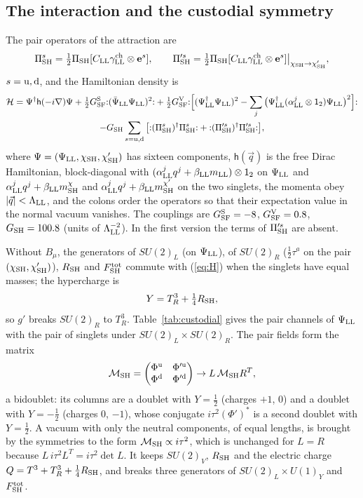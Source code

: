 \documentclass[aps,prd,onecolumn,superscriptaddress,nofootinbib,floatfix,longbibliography]{revtex4-2}
\newcommand{\LL}{{\rm LL}}
\newcommand{\SF}{{\rm SF}}
\newcommand{\SH}{{\rm SH}}
\begin{document}
\subsection{The interaction and the custodial symmetry}

The pair operators of the attraction are
\begin{equation}
\Pi^s_\SH=\tfrac12\Pi_\SH[C_\LL\gamma^{\rm ch}_\LL\otimes\mathbf e^s],\qquad \Pi'^s_\SH=\tfrac12\Pi_\SH[C_\LL\gamma^{\rm ch}_\LL\otimes\mathbf e^s]\big|_{\chi_\SH\to\chi'_\SH},
\label{eq:pairs}
\end{equation}
$s={\rm u},{\rm d}$, and the Hamiltonian density is
\begin{multline}
\mathcal H=\Psi^\dagger\mathsf h(-i\nabla)\Psi+\tfrac12G^{\rm S}_\SF{:}(\bar\Psi_\LL\Psi_\LL)^2{:}
+\tfrac12G^{\rm V}_\SF{:}\Big[(\Psi^\dagger_\LL\Psi_\LL)^2-\sum_j\big(\Psi^\dagger_\LL(\alpha^j_\LL\otimes\mathsf 1_2)\Psi_\LL\big)^2\Big]{:}\\
-G_\SH\sum_{s={\rm u},{\rm d}}\big[{:}(\Pi^s_\SH)^\dagger\Pi^s_\SH{:}+{:}(\Pi'^s_\SH)^\dagger\Pi'^s_\SH{:}\big],
\label{eq:H}
\end{multline}
where $\Psi=(\Psi_\LL,\chi_\SH,\chi'_\SH)$ has sixteen components, $\mathsf h(\vec q)$ is the free Dirac Hamiltonian,
block-diagonal with $(\alpha^j_\LL q^j+\beta_\LL m_\LL)\otimes\mathsf 1_2$ on $\Psi_\LL$ and $\alpha^j_\LL q^j+\beta_\LL m^\chi_\SH$ and
$\alpha^j_\LL q^j+\beta_\LL m^{\chi'}_\SH$ on the two singlets, the momenta obey $|\vec q|<\Lambda_\LL$, and the colons order the operators so that their expectation value in the
normal vacuum vanishes. The couplings are $G^{\rm S}_\SF=-8$, $G^{\rm V}_\SF=0.8$, $G_\SH=100.8$ (units of $\Lambda_\LL^{-2}$).
In the first version the terms of $\Pi'^s_\SH$ are absent.

Without $B_\mu$, the generators of $SU(2)_L$ (on $\Psi_\LL$), of $SU(2)_R$ ($\frac12\tau^a$ on the pair
$(\chi_\SH,\chi'_\SH)$), $R_\SH$ and $F^{\rm tot}_\SH$ commute with (\ref{eq:H}) when the singlets have equal masses; the
hypercharge is
\begin{equation}
Y=T^3_R+\tfrac14R_\SH ,
\label{eq:Y}
\end{equation}
so $g'$ breaks $SU(2)_R$ to $T^3_R$. Table~\ref{tab:custodial} gives the pair channels of $\Psi_\LL$ with the pair of singlets
under $SU(2)_L\times SU(2)_R$. The pair fields form the matrix
\begin{equation}
\mathcal M_\SH=\begin{pmatrix}\Phi^{\rm u}&\Phi'^{\rm u}\\\Phi^{\rm d}&\Phi'^{\rm d}\end{pmatrix}\to L\,\mathcal M_\SH R^T ,
\label{eq:M}
\end{equation}
a bidoublet: its columns are a doublet with $Y=\frac12$ (charges $+1$, 0) and a doublet with $Y=-\frac12$ (charges 0,
$-1$), whose conjugate $i\tau^2(\Phi')^*$ is a second doublet with $Y=\frac12$. A vacuum with only the neutral components,
of equal lengths, is brought by the symmetries to the form $\mathcal M_\SH\propto i\tau^2$, which is unchanged for $L=R$
because $L\,i\tau^2L^T=i\tau^2\det L$. It keeps $SU(2)_V$, $R_\SH$ and the electric charge
$Q=T^3+T^3_R+\frac14R_\SH$, and breaks three generators of $SU(2)_L\times U(1)_Y$ and $F^{\rm tot}_\SH$.
\end{document}
